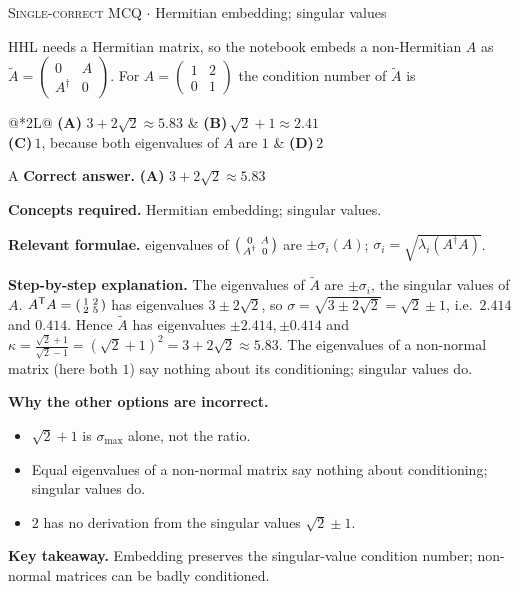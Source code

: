 \documentclass[11pt,a4paper]{article}
\newcommand{\optlabel}[1]{\textbf{(#1)}}
\newcommand{\correctlabel}[1]{\textcolor{okgreen}{\textbf{(#1)}\,\ding{51}}}
\newenvironment{qitem}[1]{\begin{list}{}{\setlength{\leftmargin}{3.3em}\setlength{\labelwidth}{3.1em}%
  \setlength{\labelsep}{0.2em}\setlength{\topsep}{3pt}\setlength{\parsep}{3pt}}\item[\textbf{Q.#1}\hfill]}{\end{list}}
\newcommand{\qsep}{\par\vspace{2pt}{\color{black!15}\hrule}\vspace{4pt}}
\newcommand{\qmeta}[2]{{\footnotesize\color{black!60}\textsc{#1} \;$\cdot$\; #2}\par}
\begin{document}
\begin{qitem}{6}
\qmeta{Single-correct MCQ}{Hermitian embedding; singular values}
HHL needs a Hermitian matrix, so the notebook embeds a non-Hermitian $A$ as $\tilde A = \begin{pmatrix}0 & A\\ A^\dagger & 0\end{pmatrix}$. For $A = \begin{pmatrix}1 & 2\\ 0 & 1\end{pmatrix}$ the
condition number of $\tilde A$ is
\par\smallskip\noindent\begin{tabularx}{\linewidth}{@{}*{2}{L}@{}}
\correctlabel{A}\,$3 + 2\sqrt2 \approx 5.83$ & \optlabel{B}\,$\sqrt2 + 1 \approx 2.41$ \\[3pt]
\optlabel{C}\,$1$, because both eigenvalues of $A$ are $1$ & \optlabel{D}\,$2$
\end{tabularx}
\end{qitem}
\begin{solbox}{A}
\textbf{\color{brand}Correct answer.} \textcolor{okgreen}{\textbf{(A)}} $3 + 2\sqrt2 \approx 5.83$

\textbf{\color{brand}Concepts required.} Hermitian embedding; singular values.

\textbf{\color{brand}Relevant formulae.} eigenvalues of $\begin{psmallmatrix}0&A\\A^\dagger&0\end{psmallmatrix}$ are $\pm\sigma_i(A)$; $\sigma_i = \sqrt{\lambda_i(A^\dagger A)}$.

\textbf{\color{brand}Step-by-step explanation.} The eigenvalues of $\tilde A$ are $\pm\sigma_i$, the singular values of $A$. $A^{\mathsf T}A = \begin{psmallmatrix}1&2\\2&5\end{psmallmatrix}$ has eigenvalues $3 \pm 2\sqrt2$,
so $\sigma = \sqrt{3 \pm 2\sqrt2} = \sqrt2 \pm 1$, i.e.\ $2.414$ and $0.414$. Hence $\tilde A$ has eigenvalues $\pm2.414, \pm0.414$ and
$\kappa = \frac{\sqrt2 + 1}{\sqrt2 - 1} = (\sqrt2 + 1)^2 = 3 + 2\sqrt2 \approx 5.83$. The eigenvalues of a non-normal matrix (here both $1$) say nothing about its
conditioning; singular values do.

\textbf{\color{brand}Why the other options are incorrect.}
\begin{itemize}[leftmargin=2.4em, itemsep=1pt, topsep=2pt]
\item[\textbf{(B)}] $\sqrt2 + 1$ is $\sigma_{\max}$ alone, not the ratio.
\item[\textbf{(C)}] Equal eigenvalues of a non-normal matrix say nothing about conditioning; singular values do.
\item[\textbf{(D)}] $2$ has no derivation from the singular values $\sqrt2 \pm 1$.
\end{itemize}
\textbf{\color{brand}Key takeaway.} Embedding preserves the singular-value condition number; non-normal matrices can be badly conditioned.
\end{solbox}
\qsep
\end{document}
